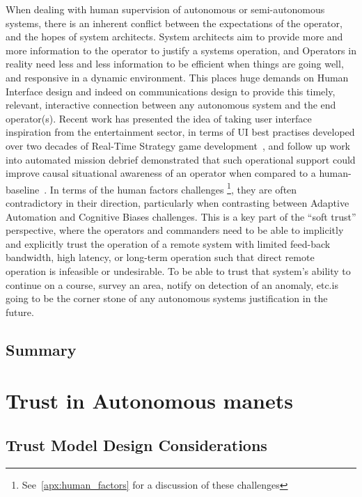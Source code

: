 When dealing with human supervision of autonomous or semi-autonomous systems, there is an inherent conflict between the expectations of the operator, and the hopes of system architects.
System architects aim to provide more and more information to the operator to justify a systems operation, and Operators in reality need less and less information to be efficient when things are going well, and responsive in a dynamic environment.
This places huge demands on Human Interface design and indeed on communications design to provide this timely, relevant, interactive connection between any autonomous system and the end operator(s).
Recent work has presented the idea of taking user interface inspiration from the entertainment sector, in terms of UI best practises developed over two decades of Real-Time Strategy game development~\cite{Johnson2007}, and follow up work into automated mission debrief demonstrated that such operational support could improve causal situational awareness of an operator when compared to a human-baseline~\cite{Johnson2011}.
In terms of the human factors challenges \footnote{See~\autoref{apx:human_factors} for a discussion of these challenges}, they are often contradictory in their direction, particularly when contrasting between Adaptive Automation and Cognitive Biases challenges.
This is a key part of the ``soft trust'' perspective, where the operators and commanders need to be able to implicitly and explicitly trust the operation of a remote system with limited feed-back bandwidth, high latency, or long-term operation such that direct remote operation is infeasible or undesirable.
To be able to trust that system's ability to continue on a course, survey an area, notify on detection of an anomaly, etc.is going to be the corner stone of any autonomous systems justification in the future.

\subsection{Summary}



\section{Trust in Autonomous \glspl{manet}}\label{sec:trust_manets}

\subsection{Trust Model Design Considerations}\label{sec:trust_model_design_considerations}

